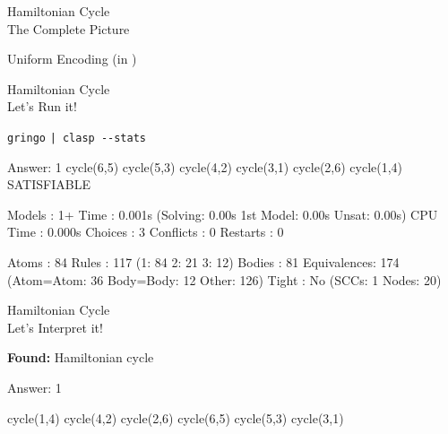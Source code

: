 \begin{frame}{Hamiltonian Cycle\\
              \normalsize The Complete Picture}
\begin{block}{Uniform Encoding (in )}

\end{block}
\end{frame}
\begin{frame}[fragile]{Hamiltonian Cycle\\
              \normalsize Let's \alert{Run} it!}
\begin{block}{\alert<1>{\lstinline{gringo}   \lstinline{| clasp --stats}}}
\vspace*{-2mm}
\pause\scriptsize%
\begin{semiverbatim}
Answer: 1
cycle(6,5) cycle(5,3) cycle(4,2) cycle(3,1) cycle(2,6) cycle(1,4)
SATISFIABLE

Models      : 1+
Time        : 0.001s (Solving: 0.00s 1st Model: 0.00s Unsat: 0.00s)
CPU Time    : 0.000s
Choices     : 3
Conflicts   : 0
Restarts    : 0

Atoms       : 84
Rules       : 117    (1: 84 2: 21 3: 12)
Bodies      : 81
Equivalences: 174    (Atom=Atom: 36 Body=Body: 12 Other: 126)
\alert{Tight       : No     (SCCs: 1 Nodes: 20)}
\end{semiverbatim}
\end{block}
\end{frame}
\begin{frame}[fragile]{Hamiltonian Cycle\\
              \normalsize Let's \alert{Interpret} it!}
\begin{block}{{\textbf{Found:} Hamiltonian cycle}}
\begin{minipage}[t]{0.48\linewidth}
\begin{semiverbatim}
Answer: 1

\alert<2>{cycle(1,4)}
\alert<3>{cycle(4,2)}
\alert<4>{cycle(2,6)}
\alert<5>{cycle(6,5)}
\alert<6>{cycle(5,3)}
\alert<7>{cycle(3,1)}
\end{semiverbatim}
\end{minipage}
\begin{minipage}[t]{0.45\linewidth}

\end{minipage}
\end{block}
\end{frame}
